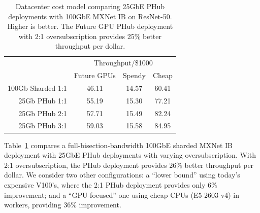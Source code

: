 \begin{table}[tb!]
  \centering
  \begin{tabular}{|r|c|c|c|}
    \hline
    & \multicolumn{3}{c|}{Throughput/\$1000} \\
    
                                 & Future GPUs & Spendy & Cheap \\
    \hline
    100Gb Sharded 1:1 &             46.11 &          14.57 &      60.41\\
    \hline 
    25Gb PHub     1:1 &             55.19 &          15.30 &      77.21\\
    \hline 
    25Gb PHub     2:1 &             57.71 &          15.49 &      82.24\\
    \hline 
    25Gb PHub     3:1 &             59.03 &          15.58 &      84.95\\
    \hline
  \end{tabular}
  \caption{Datacenter cost model comparing 25GbE PHub deployments with 100GbE MXNet IB on ResNet-50. Higher is better. The Future GPU PHub deployment with 2:1 oversubscription provides 25\% better throughput per dollar.}
  \label{table:costModel}
\end{table}


Table~\ref{table:costModel} compares a full-bisection-bandwidth 100GbE sharded MXNet IB deployment with 25GbE PHub deployments with varying oversubscription. With 2:1 oversubscription, the PHub deployment provides 26\% better throughput per dollar. We consider two other configurations: a ``lower bound'' using today's expensive V100's, where the 2:1 PHub deployment provides only 6\% improvement; and a ``GPU-focused'' one using cheap CPUs (E5-2603 v4) in workers, providing 36\% improvement.




